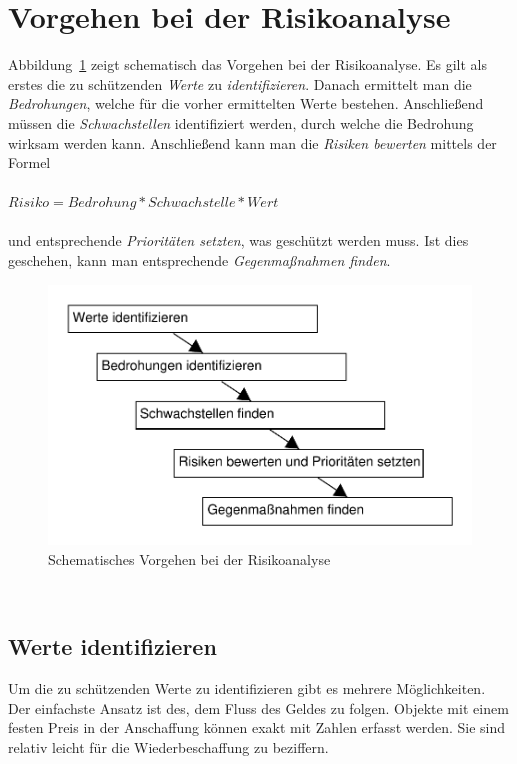 \section{Vorgehen bei der Risikoanalyse}

Abbildung~\ref{5analysestufen} zeigt schematisch das Vorgehen bei der Risikoanalyse. Es gilt als erstes die zu schützenden \textit{Werte} zu \textit{identifizieren}. Danach ermittelt man die \textit{Bedrohungen}, welche für die vorher ermittelten Werte bestehen. Anschließend müssen die \textit{Schwachstellen} identifiziert werden, durch welche die Bedrohung wirksam werden kann. Anschließend kann man die \textit{Risiken bewerten} mittels der Formel
\\\\
$ Risiko = Bedrohung * Schwachstelle * Wert $
\\\\
und entsprechende \textit{Prioritäten setzten}, was geschützt werden muss. Ist dies geschehen, kann man entsprechende \textit{Gegenmaßnahmen finden}.

\begin{figure}[h]
\includegraphics[scale=0.8]{images/5analysestufen.pdf}
\caption{Schematisches Vorgehen bei der Risikoanalyse}
\label{5analysestufen}
\end{figure}

\\

\subsection{Werte identifizieren}
Um die zu schützenden Werte zu identifizieren gibt es mehrere Möglichkeiten. Der einfachste Ansatz ist des, dem Fluss des Geldes zu folgen. Objekte mit einem festen Preis in der Anschaffung können exakt mit Zahlen erfasst werden. Sie sind relativ leicht für die Wiederbeschaffung zu beziffern. 